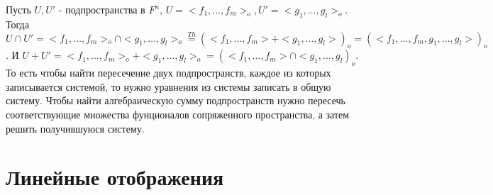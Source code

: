 \begin{corollary}
	Пусть \(U, U'\) - подпространства в \(F^n\), \(U = <f_1, \ldots, f_m>_o, U' = <g_1, \ldots, g_l>_o\). Тогда \(U\cap U' = <f_1, \ldots, f_m>_o\cap <g_1, \ldots, g_l>_o \overset{Th}{=} (<f_1, \ldots, f_m> + <g_1, \ldots, g_l>)_o = (<f_1,\ldots, f_m,g_1,\ldots, g_l>)_o\). И \(U+U' = <f_1,\ldots, f_m>_o + <g_1, \ldots, g_l>_o = (<f_1, \ldots, f_m>\cap <g_1, \ldots, g_l)_o\). То есть чтобы найти пересечение двух подпространств, каждое из которых записывается системой, то нужно уравнения из системы записать в общую систему. Чтобы найти алгебраическую сумму подпространств нужно пересечь соответствующие множества фунционалов сопряженного пространства, а затем решить получившуюся систему.
\end{corollary}



\section{Линейные отображения}


